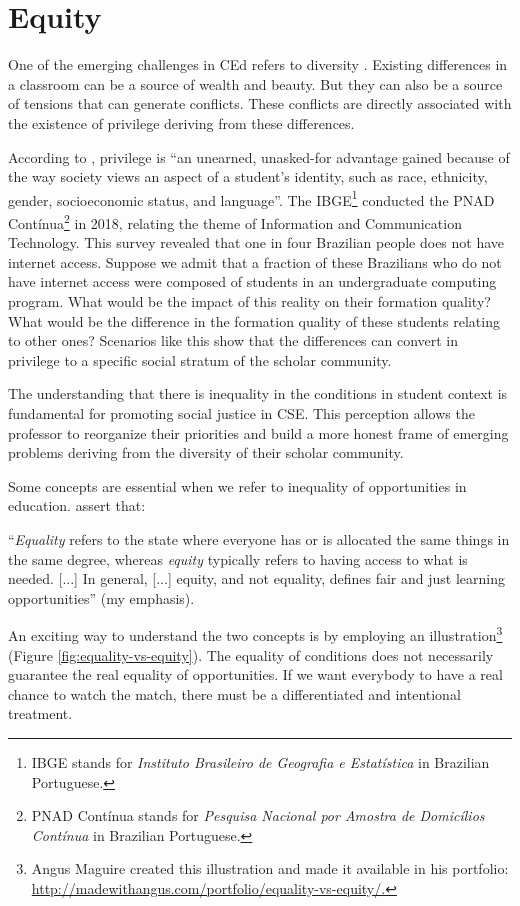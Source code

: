 \chapter{Equity}
\label{chap:equity}

 One of the emerging challenges in \acrfull{CEd} refers to diversity \cite[p.~19:2]{burgstahler:2011}. Existing differences in a classroom can be a source of wealth and beauty. But they can also be a source of tensions that can generate conflicts. These conflicts are directly associated with the existence of privilege deriving from these differences.
 
According to , privilege is “an unearned, unasked-for advantage gained because of the way society views an aspect of a student’s identity, such as race, ethnicity, gender, socioeconomic status, and language”. The \gls{IBGE}\footnote{IBGE stands for \textit{Instituto Brasileiro de Geografia e Estatística} in Brazilian Portuguese.} conducted the \gls{PNAD Contínua}\footnote{PNAD Contínua stands for \textit{Pesquisa Nacional por Amostra de Domicílios Contínua} in Brazilian Portuguese.} in 2018, relating the theme of Information and Communication Technology. This survey revealed that one in four Brazilian people does not have internet access. Suppose we admit that a fraction of these Brazilians who do not have internet access were composed of students in an undergraduate computing program. What would be the impact of this reality on their formation quality? What would be the difference in the formation quality of these students relating to other ones? Scenarios like this show that the differences can convert in privilege to a specific social stratum of the scholar community.

The understanding that there is inequality in the conditions in student context is fundamental for promoting social justice in \acrfull{CSE}. This perception allows the professor to reorganize their priorities and build a more honest frame of emerging problems deriving from the diversity of their scholar community.

Some concepts are essential when we refer to inequality of opportunities in education.  assert that:
\begin{citacao}
    “\textit{Equality} refers to the state where everyone has or is allocated the same things in the same degree, whereas \textit{equity} typically refers to having access to what is needed. [...] In general, [...] equity, and not equality, defines fair and just learning opportunities” (my emphasis).
\end{citacao}
An exciting way to understand the two concepts is by employing an illustration\footnote{Angus Maguire created this illustration and made it available in his portfolio: \url{http://madewithangus.com/portfolio/equality-vs-equity/.}} (Figure \ref{fig:equality-vs-equity}). The equality of conditions does not necessarily guarantee the real equality of opportunities. If we want everybody to have a real chance to watch the match, there must be a differentiated and intentional treatment. 

